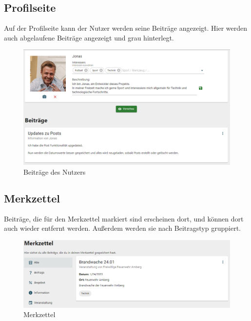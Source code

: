 \clearpage
\subsection{Profilseite}
\label{sec:profilepage}

Auf der Profilseite kann der Nutzer werden seine Beiträge angezeigt.
Hier werden auch abgelaufene Beiträge angezeigt und grau hinterlegt.

\begin{figure}[ht!]
    \begin{centering}
        \includegraphics[width=1\textwidth]{figures/implementation/userposts.png}
        \caption{Beiträge des Nutzers}
        \label{fig:userposts}
    \end{centering}
\end{figure}

\subsection{Merkzettel}
\label{sec:bookmark}

Beiträge, die für den Merkzettel markiert sind erscheinen dort, und können dort auch wieder entfernt werden.
Außerdem werden sie nach Beitragstyp gruppiert.

\begin{figure}[ht!]
    \begin{centering}
        \includegraphics[width=1\textwidth]{figures/implementation/merkzettel.png}
        \caption{Merkzettel}
        \label{fig:merkzettel_impl}
    \end{centering}
\end{figure}

